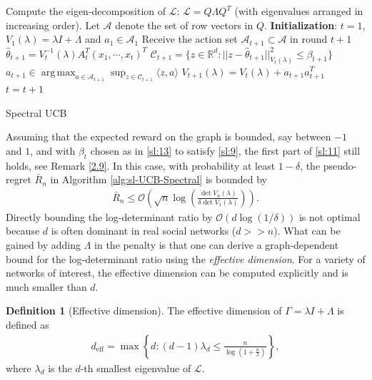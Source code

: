 \documentclass[letterpaper,11pt,openright,openany]{book}
\numberwithin{equation}{section}
\theoremstyle{plain}
\theoremstyle{definition}
\newtheorem{Def}[Th]{Definition}
\def\R{{\mathbb R}}
\def\R{{\mathbb R}}
\def\t{{\theta}}
\DeclareMathOperator*{\argmax}{arg\,max}
\begin{document}
\begin{algorithm}[H]
\begin{algorithmic}[1]
\STATE Compute the eigen-decomposition of $\mathcal L$: $\mathcal L = Q\Lambda Q^T$ (with eigenvalues arranged in increasing order). Let $\mathcal A$ denote the set of row vectors in $Q$. 
\STATE  \textbf{Initialization}: $t=1$, $V_1(\lambda) = \lambda I+\Lambda$ and $a_1\in\mathcal A_1$
 \STATE Receive the action set $\mathcal A_{t+1}\subset\mathcal A$ in round $t+1$
\STATE $\hat{\t}_{t+1} = V^{-1}_{t}(\lambda)A_{t}^T(x_1, \cdots, x_{t})^T$
\STATE $\mathcal C_{t+1} = \{z\in\R^d: ||z-\hat{\t}_{t+1}||^2_{V_{t}(\lambda)}\leq\beta_{t+1}\}$
\STATE $a_{t+1} \in \argmax_{a\in\mathcal A_{t+1}}\sup_{z\in\mathcal C_{t+1}}\langle z, a\rangle$
\STATE $V_{t+1}(\lambda) = V_{t}(\lambda)+a_{t+1}a_{t+1}^T$ 
\STATE $t = t +1$
\ENDWHILE
\end{algorithmic}
\caption{Spectral UCB} 
\label{alg:sl-UCB-Spectral}
\end{algorithm}
Assuming that the expected reward on the graph is bounded, say between $-1$ and $1$, and with $\beta_t$ chosen as in \eqref{sl:13} to satisfy \eqref{sl:9}, the first part of \eqref{sl:11} still holds, see Remark \ref{2.9}.  In this case, with probability at least $1-\delta$, the pseudo-regret $\bar{R}_n$ in Algorithm \ref{alg:sl-UCB-Spectral} is bounded by
\begin{align}
\bar{R}_n \leq \mathcal O\left(\sqrt{n}\log\left(\frac{\det V_n(\lambda)}{\delta\det V_1(\lambda)}\right)\right). \label{spec-ubc-bdd}
\end{align} 
Directly bounding the log-determinant ratio by $\mathcal O(d\log (1/\delta))$ is not optimal because $d$ is often dominant in real social networks ($d>>n$). 
What can be gained by adding $\Lambda$ in the penalty is that one can derive a graph-dependent bound for the log-determinant ratio using the \emph{effective dimension}. 
For a variety of networks of interest, the effective dimension can be computed explicitly and is much smaller than $d$. 

\begin{Def}[Effective dimension]\label{?}
The effective dimension of $\Gamma = \lambda I+\Lambda$ is defined as 
\begin{align*}
d_{\text{eff}}=\max\left\{d: (d-1)\lambda_d\leq\frac{n}{\log(1+\frac{n}{\lambda})}\right\}, 
\end{align*}
where $\lambda_d$ is the $d$-th smallest eigenvalue of $\mathcal L$. 
\end{Def}
\end{document}
